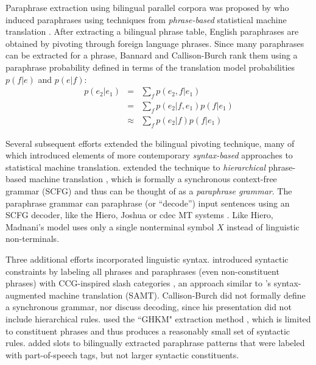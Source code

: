 \documentclass[11pt]{article}
\begin{document}
Paraphrase extraction using bilingual parallel corpora was proposed by
 who induced paraphrases using techniques
from {\it phrase-based} statistical machine translation
\cite{Koehn2003}. After extracting a bilingual phrase table, English
paraphrases are obtained by pivoting through foreign language
phrases.
Since many paraphrases can be extracted for a phrase, Bannard and
Callison-Burch rank them using a paraphrase probability defined in
terms of the translation model probabilities $p(f | e)$ and $p(e |
f)$: \nocite{Callison-Burch2005}
\begin{eqnarray}
  p(e_2|e_1) &=& \sum_f p(e_2,f|e_1)\\
                  &=& \sum_f p(e_2|f,e_1) p(f|e_1) \\
                  &\approx& \sum_f p(e_2|f) p(f|e_1)
\label{paraphrase_prob_eqn}
\end{eqnarray}

Several subsequent efforts extended the bilingual pivoting technique,
many of which introduced elements of more contemporary {\it
  syntax-based} approaches to statistical machine translation.
 extended the technique to {\it hierarchical}
phrase-based machine translation \cite{Chiang2005}, which is formally
a synchronous context-free grammar (SCFG) and thus can be thought of
as a {\it paraphrase grammar}. The paraphrase grammar can paraphrase
(or ``decode'') input sentences using an SCFG decoder, like the Hiero,
Joshua or cdec MT systems \cite{Chiang2007,Joshua-WMT,Dyer_etal_2010}.
Like Hiero, Madnani's model uses only a single nonterminal symbol
$X$ instead of linguistic non-terminals.


Three additional efforts incorporated linguistic
syntax.  introduced syntactic constraints
by labeling all phrases and paraphrases (even non-constituent phrases)
with CCG-inspired slash categories \cite{Steedman2011}, an approach similar to
's syntax-augmented machine translation
(SAMT). Callison-Burch did not formally define a synchronous grammar,
nor discuss decoding, since his presentation did not include
hierarchical rules.   used the ``GHKM"
extraction method \cite{Galley2004}, which is limited to constituent
phrases and thus produces a reasonably small set of syntactic rules.
 added slots to bilingually extracted paraphrase
patterns that were labeled with part-of-speech tags, but not larger
syntactic constituents.
\end{document}
